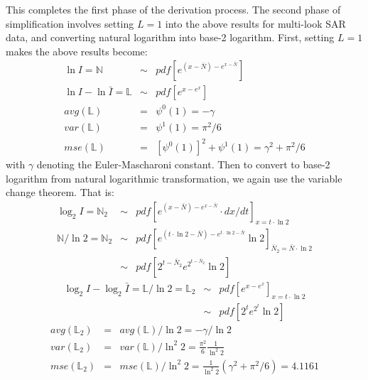 \documentclass[journal,12pt,draftcls,onecolumn]{IEEEtran}
\begin{document}
This completes the first phase of the derivation process.
The second phase of simplification involves setting $L=1$ into the above results for multi-look SAR data,
  and converting natural logarithm into base-2 logarithm.
First, setting $L=1$ makes the above results become:
\begin{eqnarray*}
   \ln{I} = \mathbb{N} &\sim&  pdf \left[ e^{(x-\bar{N})-e^{x-\bar{N}}} \right] \\
   \ln{I} - \ln{\bar{I}} = \mathbb{L} &\sim& pdf \left[ e^{x-e^x}  \right] \\ 
    avg(\mathbb{L}) &=& \psi^0(1) = -\gamma \\
    var(\mathbb{L}) &=& \psi^1(1) = \pi^2 / 6 \\  
    mse(\mathbb{L}) &=& \left[ \psi^0(1) \right]^2 + \psi^1(1) = \gamma^2 + \pi^2 / 6
\end{eqnarray*}
with $\gamma$ denoting the Euler-Mascharoni constant.
Then to convert to base-2 logarithm from natural logarithmic transformation,
  we again use the variable change theorem.
  That is:
  \begin{eqnarray*}
   \log_2{I}  = \mathbb{N}_2    &\sim&  pdf \left[ e^{(x-\bar{N})-e^{x-\bar{N}}} \cdot dx/dt \right]_{x=t\cdot \ln{2}} \\
   \mathbb{N} / \ln{2} = \mathbb{N}_2 &\sim&  pdf \left[ e^{(t\cdot \ln{2}-\bar{N})-e^{t\cdot \ln{2}-\bar{N}}} \ln{2} \right]_{\bar{N}_2 = \bar{N} \cdot \ln{2}} \\
       &\sim&  pdf \left[ 2^{t-\bar{N}_2}e^{2^{t-\bar{N}_2}} \ln{2} \right] 
  \end{eqnarray*}
\begin{eqnarray*}
   \log_2{I} - \log_2{\bar{I}} = \mathbb{L} / \ln{2} = \mathbb{L}_2 &\sim& pdf \left[ e^{x-e^x}  \right]_{x=t \cdot \ln{2}} \\  
       &\sim& pdf \left[ 2^t e^{2^t} \ln{2}  \right] 
\end{eqnarray*}
\begin{eqnarray*}
  avg(\mathbb{L}_2) &=& avg(\mathbb{L})/ \ln{2} = -\gamma / \ln{2} \\
  var(\mathbb{L}_2) &=& var(\mathbb{L})/ \ln^2{2} = \frac{\pi^2}{6} \frac{1}{ \ln^2{2}} \\
  mse(\mathbb{L}_2) &=& mse(\mathbb{L})/ \ln^2{2} = \frac{1}{\ln^2{2}}( \gamma^2 + \pi^2/6 ) = 4.1161 
\end{eqnarray*}
\end{document}

